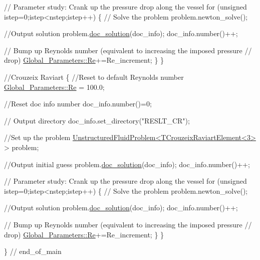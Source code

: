 \begin{DoxyCodeInclude}
  
  \textcolor{comment}{// Parameter study: Crank up the pressure drop along the vessel}
  \textcolor{keywordflow}{for} (\textcolor{keywordtype}{unsigned} istep=0;istep<nstep;istep++)
   \{
    \textcolor{comment}{// Solve the problem}
    problem.newton\_solve();
    
    \textcolor{comment}{//Output solution}
    problem.\hyperlink{classUnstructuredFluidProblem_abcc9f0065665ae5239988b1a812e3f78}{doc\_solution}(doc\_info);
    doc\_info.number()++;
    
    \textcolor{comment}{// Bump up Reynolds number (equivalent to increasing the imposed pressure}
    \textcolor{comment}{// drop)}
    \hyperlink{namespaceGlobal__Parameters_a9d72e94a9305c6a310940a6a427ebe06}{Global\_Parameters::Re}+=Re\_increment;   
   \}
 \}

 \textcolor{comment}{//Crouzeix Raviart}
 \{
  \textcolor{comment}{//Reset to default Reynolds number}
  \hyperlink{namespaceGlobal__Parameters_a9d72e94a9305c6a310940a6a427ebe06}{Global\_Parameters::Re} = 100.0;

  \textcolor{comment}{//Reset doc info number}
  doc\_info.number()=0;   

  \textcolor{comment}{// Output directory}
  doc\_info.set\_directory(\textcolor{stringliteral}{"RESLT\_CR"});
  
  \textcolor{comment}{//Set up the problem}
  \hyperlink{classUnstructuredFluidProblem}{UnstructuredFluidProblem<TCrouzeixRaviartElement<3>} > 
      problem;

  \textcolor{comment}{//Output initial guess}
  problem.\hyperlink{classUnstructuredFluidProblem_abcc9f0065665ae5239988b1a812e3f78}{doc\_solution}(doc\_info);
  doc\_info.number()++;   
  
  \textcolor{comment}{// Parameter study: Crank up the pressure drop along the vessel}
  \textcolor{keywordflow}{for} (\textcolor{keywordtype}{unsigned} istep=0;istep<nstep;istep++)
   \{
    \textcolor{comment}{// Solve the problem}
    problem.newton\_solve();
    
    \textcolor{comment}{//Output solution}
    problem.\hyperlink{classUnstructuredFluidProblem_abcc9f0065665ae5239988b1a812e3f78}{doc\_solution}(doc\_info);
    doc\_info.number()++;
    
    \textcolor{comment}{// Bump up Reynolds number (equivalent to increasing the imposed pressure}
    \textcolor{comment}{// drop)}
    \hyperlink{namespaceGlobal__Parameters_a9d72e94a9305c6a310940a6a427ebe06}{Global\_Parameters::Re}+=Re\_increment;   
   \}
 \}
 
\} \textcolor{comment}{// end\_of\_main}

\end{DoxyCodeInclude}




